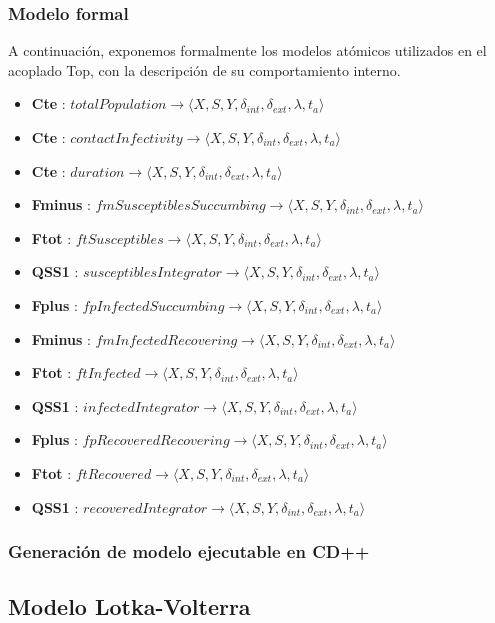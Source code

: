\subsubsection{Modelo formal}
A continuación, exponemos formalmente los modelos atómicos utilizados en el acoplado Top, con la descripción de su comportamiento interno.
\begin{itemize}
\item \textbf{Cte} : $ totalPopulation \rightarrow \langle X, S, Y, \delta_{int}, \delta_{ext}, \lambda, t_{a} \rangle$
\item \textbf{Cte} : $ contactInfectivity \rightarrow \langle X, S, Y, \delta_{int}, \delta_{ext}, \lambda, t_{a} \rangle$
\item \textbf{Cte} : $ duration \rightarrow \langle X, S, Y, \delta_{int}, \delta_{ext}, \lambda, t_{a} \rangle$
\item \textbf{Fminus} : $ fmSusceptiblesSuccumbing \rightarrow \langle X, S, Y, \delta_{int}, \delta_{ext}, \lambda, t_{a} \rangle$
\item \textbf{Ftot} : $ ftSusceptibles \rightarrow \langle X, S, Y, \delta_{int}, \delta_{ext}, \lambda, t_{a} \rangle$
\item \textbf{QSS1} : $ susceptiblesIntegrator \rightarrow \langle X, S, Y, \delta_{int}, \delta_{ext}, \lambda, t_{a} \rangle$
\item \textbf{Fplus} : $ fpInfectedSuccumbing \rightarrow \langle X, S, Y, \delta_{int}, \delta_{ext}, \lambda, t_{a} \rangle$
\item \textbf{Fminus} : $ fmInfectedRecovering \rightarrow \langle X, S, Y, \delta_{int}, \delta_{ext}, \lambda, t_{a} \rangle$
\item \textbf{Ftot} : $ ftInfected \rightarrow \langle X, S, Y, \delta_{int}, \delta_{ext}, \lambda, t_{a} \rangle$
\item \textbf{QSS1} : $ infectedIntegrator \rightarrow \langle X, S, Y, \delta_{int}, \delta_{ext}, \lambda, t_{a} \rangle$
\item \textbf{Fplus} : $ fpRecoveredRecovering \rightarrow \langle X, S, Y, \delta_{int}, \delta_{ext}, \lambda, t_{a} \rangle$
\item \textbf{Ftot} : $ ftRecovered \rightarrow \langle X, S, Y, \delta_{int}, \delta_{ext}, \lambda, t_{a} \rangle$
\item \textbf{QSS1} : $ recoveredIntegrator \rightarrow \langle X, S, Y, \delta_{int}, \delta_{ext}, \lambda, t_{a} \rangle$
\end{itemize}

\subsubsection{Generación de modelo ejecutable en CD++}


\subsection{Modelo Lotka-Volterra}
